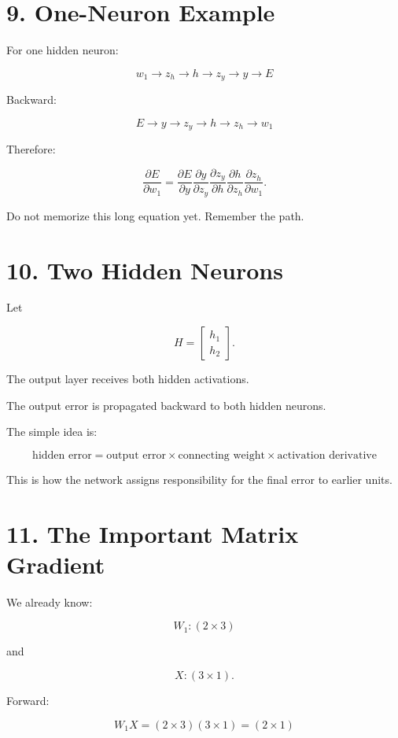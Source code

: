 \documentclass[11pt]{article}
\begin{document}
\section*{9. One-Neuron Example}

For one hidden neuron:

\[
w_1\rightarrow z_h\rightarrow h\rightarrow z_y\rightarrow y\rightarrow E
\]

Backward:

\[
E\rightarrow y\rightarrow z_y\rightarrow h\rightarrow z_h\rightarrow w_1
\]

Therefore:

\[
\frac{\partial E}{\partial w_1}
=
\frac{\partial E}{\partial y}
\frac{\partial y}{\partial z_y}
\frac{\partial z_y}{\partial h}
\frac{\partial h}{\partial z_h}
\frac{\partial z_h}{\partial w_1}.
\]

Do not memorize this long equation yet. Remember the path.

\section*{10. Two Hidden Neurons}

Let

\[
H=
\begin{bmatrix}
h_1\\h_2
\end{bmatrix}.
\]

The output layer receives both hidden activations.

The output error is propagated backward to both hidden neurons.

The simple idea is:

\[
\boxed{
\text{hidden error}
=
\text{output error}
\times
\text{connecting weight}
\times
\text{activation derivative}
}
\]

This is how the network assigns responsibility for the final error to earlier units.

\section*{11. The Important Matrix Gradient}

We already know:

\[
W_1:(2\times3)
\]

and

\[
X:(3\times1).
\]

Forward:

\[
\boxed{
W_1X=(2\times3)(3\times1)=(2\times1)
}
\]
\end{document}
